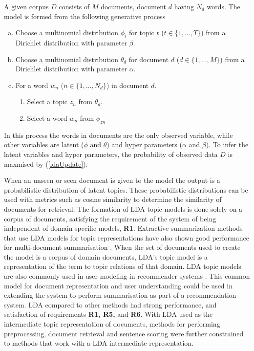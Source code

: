 A given corpus $D$ consists of $M$ documents, document $d$ having $N_d$ words.
The model is formed from the following generative process
\begin{enumerate}[(a)]
      \item Choose a multinomial distribution $\phi_t$ for topic $t$ ($t \in \{1,\dots,T\}$) from a Dirichlet distribution with parameter $\beta$.
      \item Choose a multinomial distribution $\theta_d$ for document $d$ ($d \in \{1,\dots,M\}$) from a Dirichlet distribution with parameter $\alpha$.
      \item For a word $w_n$ ($n \in \{1,\dots,{N_d}\}$) in document $d$.
      \begin{enumerate}
            \item Select a topic $z_n$ from $\theta_d$.
            \item Select a word $w_n$ from $\phi_{zn}$
      \end{enumerate}
\end{enumerate}
In this process the words in documents are the only observed variable, while other variables are latent ($\phi$ and $\theta$) and hyper parameters ($\alpha$ and $\beta$). To infer the latent variables and hyper parameters, the probability of observed data $D$ is maxmised by (\ref{ldaUpdate}).

When an unseen or seen document is given to the model the output is a probabilistic distribution of latent topics. These probabilistic distributions can be used with metrics such as cosine similarity to determine the similarity of documents for retrieval. The formation of LDA topic models is done solely on a corpus of documents, satisfying the requirement of the system of being independent of domain specific models, \textbf{R1}. Extractive summarization methods that use LDA models for topic representations have also shown good performance for multi-document summarisation \citep{daume2006domain,wang2009multi}. When the set of documents used to create the model is a corpus of domain documents, LDA’s topic model is a representation of the term to topic relations of that domain. LDA topic models are also commonly used in user modeling in recommender systems \citep{pandit2013query, harvey2013building, mehrotra2015terms}. This common model for document representation and user understanding could be used in extending the system to perform summarisation as part of a recommendation system. LDA compared to other methods had strong performance, and satisfaction of requirements \textbf{R1, R5,} and \textbf{R6}. With LDA used as the intermediate topic representation of documents, methods for performing preprocessing, document retrieval and sentence scoring were further constrained to methods that work with a LDA intermediate representation.

